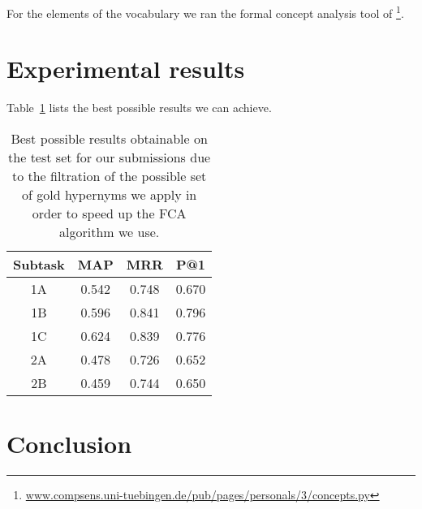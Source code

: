 \documentclass[11pt,a4paper]{article}
\begin{document}
For the elements of the vocabulary we ran the formal concept analysis tool of
\citet{Endres:2010} \footnote{\url{www.compsens.uni-tuebingen.de/pub/pages/personals/3/concepts.py}}.

\section{Experimental results}

Table~\ref{table:upper} lists the best possible results we can achieve.

\begin{table}
	\centering
	\begin{tabular}{c|ccc}
		Subtask & MAP & MRR & P@1 \\ \hline 
		1A & 0.542 & 0.748 & 0.670 \\
		1B & 0.596 & 0.841 & 0.796 \\
		1C & 0.624 & 0.839 & 0.776 \\
		2A & 0.478 & 0.726 & 0.652 \\
		2B & 0.459 & 0.744 & 0.650 \\
	\end{tabular}
	\label{table:upper}
	\caption{Best possible results obtainable on the test set for our 
submissions due to the filtration of the possible set of gold hypernyms 
we apply in order to speed up the FCA algorithm we use.}
\end{table}

\section{Conclusion}



\end{document}
